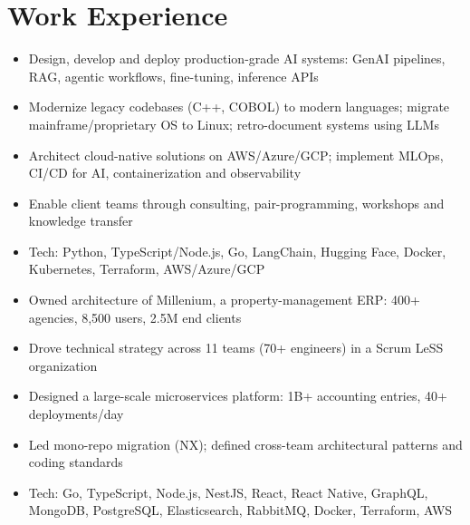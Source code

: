 
\section{Work Experience}

\begin{minipage}{.9\textwidth}
    \raggedright
    \begin{itemize}
        \item Design, develop and deploy production-grade AI systems: GenAI pipelines, RAG, agentic workflows, fine-tuning, inference APIs
        \item Modernize legacy codebases (C++, COBOL) to modern languages; migrate mainframe/proprietary OS to Linux; retro-document systems using LLMs
        \item Architect cloud-native solutions on AWS/Azure/GCP; implement MLOps, CI/CD for AI, containerization and observability
        \item Enable client teams through consulting, pair-programming, workshops and knowledge transfer
        \item Tech: Python, TypeScript/Node.js, Go, LangChain, Hugging Face, Docker, Kubernetes, Terraform, AWS/Azure/GCP
    \end{itemize}
\end{minipage}

\begin{minipage}{.9\textwidth}
    \raggedright
    \begin{itemize}
        \item Owned architecture of Millenium, a property-management ERP: 400+ agencies, 8,500 users, 2.5M end clients
        \item Drove technical strategy across 11 teams (70+ engineers) in a Scrum LeSS organization
        \item Designed a large-scale microservices platform: 1B+ accounting entries, 40+ deployments/day
        \item Led mono-repo migration (NX); defined cross-team architectural patterns and coding standards
        \item Tech: Go, TypeScript, Node.js, NestJS, React, React Native, GraphQL, MongoDB, PostgreSQL, Elasticsearch, RabbitMQ, Docker, Terraform, AWS
    \end{itemize}
\end{minipage}


